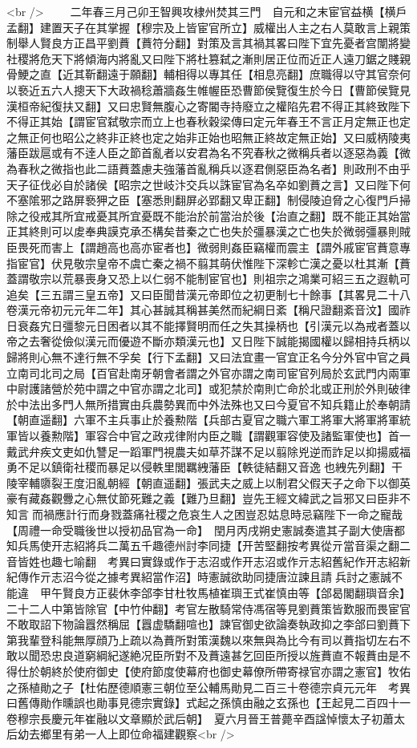 <br />
　　二年春三月己卯王智興攻棣州焚其三門　自元和之末宦官益横【横戶孟翻】建置天子在其掌握【穆宗及上皆宦官所立】威權出人主之右人莫敢言上親策制舉人賢良方正昌平劉蕡【蕡符分翻】對策及言其禍其畧曰陛下宜先憂者宫闈將變社稷將危天下將傾海内將亂又曰陛下將杜篡弑之漸則居正位而近正人遠刀鋸之賤親骨鯁之直【近其靳翻遠于願翻】輔相得以專其任【相息亮翻】庶職得以守其官奈何以䙝近五六人摠天下大政禍稔蕭牆姦生帷幄臣恐曹節侯覽復生於今日【曹節侯覽見漢桓帝紀復扶又翻】又曰忠賢無腹心之寄閽寺持廢立之權陷先君不得正其終致陛下不得正其始【謂宦官弑敬宗而立上也春秋穀梁傳曰定元年春王不言正月定無正也定之無正何也昭公之終非正終也定之始非正始也昭無正終故定無正始】又曰威柄陵夷藩臣跋扈或有不逹人臣之節首亂者以安君為名不究春秋之微稱兵者以逐惡為義【微為春秋之微指也此二語蕡蓋慮夫強藩首亂稱兵以逐君側惡臣為名者】則政刑不由乎天子征伐必自於諸侯【昭宗之世岐汴交兵以誅宦官為名卒如劉蕡之言】又曰陛下何不塞隂邪之路屏䙝狎之臣【塞悉則翻屏必郢翻又卑正翻】制侵陵迫脅之心復門戶掃除之役戒其所宜戒憂其所宜憂既不能治於前當治於後【治直之翻】既不能正其始當正其終則可以䖍奉典謨克承丕構矣昔秦之亡也失於彊暴漢之亡也失於微弱彊暴則賊臣畏死而害上【謂趙高也高亦宦者也】微弱則姦臣竊權而震主【謂外戚宦官蕡意專指宦官】伏見敬宗皇帝不虞亡秦之禍不翦其萌伏惟陛下深軫亡漢之憂以杜其漸【蕡蓋謂敬宗以荒暴喪身又恐上以仁弱不能制宦官也】則祖宗之鴻業可紹三五之遐軌可追矣【三五謂三皇五帝】又曰臣聞昔漢元帝即位之初更制七十餘事【其畧見二十八卷漢元帝初元元年二年】其心甚誠其稱甚美然而紀綱日紊【稱尺證翻紊音汶】國祚日衰姦宄日彊黎元日困者以其不能擇賢明而任之失其操柄也【引漢元以為戒者蓋以帝之去奢從儉似漢元而優遊不斷亦類漢元也】又日陛下誠能揭國權以歸相持兵柄以歸將則心無不達行無不孚矣【行下孟翻】又曰法宜畫一官宜正名今分外官中官之員立南司北司之局【百官赴南牙朝會者謂之外官亦謂之南司宦官列局於玄武門内兩軍中尉護諸營於苑中謂之中官亦謂之北司】或犯禁於南則亡命於北或正刑於外則破律於中法出多門人無所措實由兵農勢異而中外法殊也又曰今夏官不知兵籍止於奉朝請【朝直遥翻】六軍不主兵事止於養勲階【兵部古夏官之職六軍工將軍大將軍將軍統軍皆以養勲階】軍容合中官之政戎律附内臣之職【謂觀軍容使及諸監軍使也】首一戴武弁疾文吏如仇讐足一蹈軍門視農夫如草芥謀不足以翦除兇逆而詐足以抑揚威福勇不足以鎮衛社稷而暴足以侵軼里閭羈絏藩臣【軼徒結翻又音逸也絏先列翻】干陵宰輔隳裂王度汨亂朝經【朝直遥翻】張武夫之威上以制君父假天子之命下以御英豪有藏姦觀釁之心無仗節死難之義【難乃旦翻】豈先王經文緯武之旨邪又曰臣非不知言而禍應計行而身戮蓋痛社稷之危哀生人之困豈忍姑息時忌竊陛下一命之寵哉【周禮一命受職後世以授初品官為一命】　閏月丙戌朔史憲誠奏遣其子副大使唐都知兵馬使开志紹將兵二萬五千趣德州討李同捷【开苦堅翻按考異從亓當音渠之翻二音皆姓也趣七喻翻　考異曰實錄或作于志沼或作开志沼或作亓志紹舊紀作开志紹新紀傳作亓志沼今從之據考異紹當作沼】時憲誠欲助同捷唐泣諫且請兵討之憲誠不能違　甲午賢良方正裴休李郃李甘杜牧馬植崔璵王式崔慎由等【郃曷閣翻璵音余】二十二人中第皆除官【中竹仲翻】考官左散騎常侍馮宿等見劉蕡策皆歎服而畏宦官不敢取詔下物論囂然稱屈【囂虚驕翻喧也】諫官御史欲論奏執政抑之李郃曰劉蕡下第我輩登科能無厚顔乃上疏以為蕡所對策漢魏以來無與為比今有司以蕡指切左右不敢以聞恐忠良道窮綱紀遂絶况臣所對不及蕡遠甚乞回臣所授以旌蕡直不報蕡由是不得仕於朝終於使府御史【使府節度使幕府也御史幕僚所帶寄禄官亦謂之憲官】牧佑之孫植勛之子【杜佑歷德順憲三朝位至公輔馬勛見二百三十卷德宗貞元元年　考異曰舊傳勛作曛誤也勛事見德宗實錄】式起之孫慎由融之玄孫也【王起見二百四十一卷穆宗長慶元年崔融以文章顯於武后朝】　夏六月晉王普薨辛酉諡悼懷太子初蕭太后幼去鄉里有弟一人上即位命福建觀察<br />
